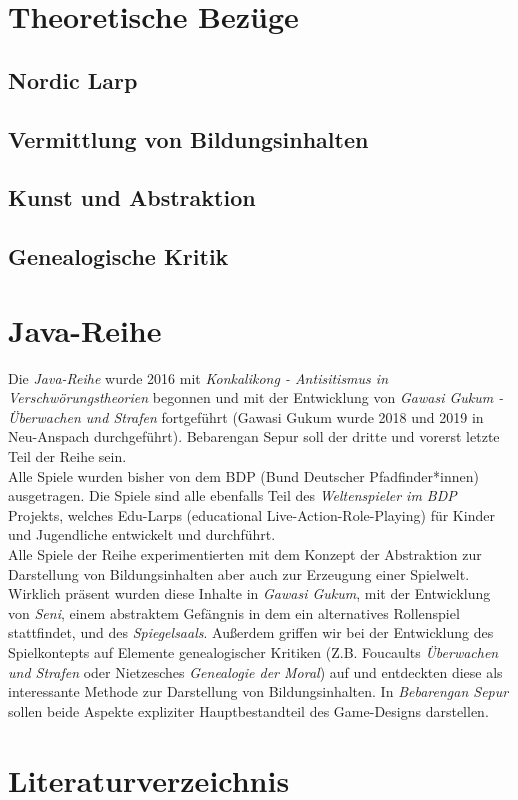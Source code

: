 \documentclass[a4paper, 12pt]{scrartcl}
\begin{document}
    \section{Theoretische Bezüge}
    \subsection{Nordic Larp} \label{nordic-larp}
    \subsection{Vermittlung von Bildungsinhalten}
    \subsection{Kunst und Abstraktion} \label{kunst-abstraktion}
    \subsection{Genealogische Kritik} \label{genealogische-kritik}

    \section{Java-Reihe} \label{java-reihe}
    Die \textit{Java-Reihe} wurde 2016 mit \textit{Konkalikong - Antisitismus in Verschwörungstheorien} begonnen und mit der Entwicklung von \textit{Gawasi Gukum - Überwachen und Strafen} fortgeführt (Gawasi Gukum wurde 2018 und 2019 in Neu-Anspach durchgeführt).
    Bebarengan Sepur soll der dritte und vorerst letzte Teil der Reihe sein.\\ 
    Alle Spiele wurden bisher von dem BDP (Bund Deutscher Pfadfinder*innen) ausgetragen. 
    Die Spiele sind alle ebenfalls Teil des \textit{Weltenspieler im BDP} Projekts, welches Edu-Larps (educational Live-Action-Role-Playing) für Kinder und Jugendliche entwickelt und durchführt. \\
    Alle Spiele der Reihe experimentierten mit dem Konzept der Abstraktion zur Darstellung von Bildungsinhalten aber auch zur Erzeugung einer Spielwelt. 
    Wirklich präsent wurden diese Inhalte in \textit{Gawasi Gukum}, mit der Entwicklung von \textit{Seni}, einem abstraktem Gefängnis in dem ein alternatives Rollenspiel stattfindet, und des \textit{Spiegelsaals}.
    Außerdem griffen wir bei der Entwicklung des Spielkontepts auf Elemente genealogischer Kritiken (Z.B. Foucaults \textit{Überwachen und Strafen} oder Nietzesches \textit{Genealogie der Moral}) auf und entdeckten diese als interessante Methode zur Darstellung von Bildungsinhalten.
    In \textit{Bebarengan Sepur} sollen beide Aspekte expliziter Hauptbestandteil des Game-Designs darstellen. 

    \section{Literaturverzeichnis}

 

  
\end{document}
